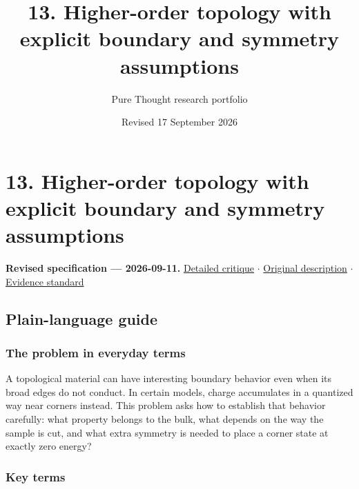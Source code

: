\documentclass[
  11pt,
]{article}
\title{13. Higher-order topology with explicit boundary and symmetry
assumptions}
\author{Pure Thought research portfolio}
\date{Revised 17 September 2026}
\begin{document}
\maketitle
\thispagestyle{empty}
\clearpage

\section{13. Higher-order topology with explicit boundary and symmetry
assumptions}

\textbf{Revised specification --- 2026-09-11.}
\href{https://github.com/rick-stevens-ai/Pure-Thought/blob/main/reviews/13-Higher-Order-Topological-Insulators.md}{Detailed
critique} \ensuremath{\cdot}
\href{https://github.com/rick-stevens-ai/Pure-Thought/blob/main/archive/original-PRDs/13-Higher-Order-Topological-Insulators.md}{Original
description} \ensuremath{\cdot}
\href{https://github.com/rick-stevens-ai/Pure-Thought/blob/main/reviews/EVIDENCE-STANDARD.md}{Evidence
standard}

\subsection{Plain-language guide}

\subsubsection{The problem in everyday terms}

A topological material can have interesting boundary behavior even when
its broad edges do not conduct. In certain models, charge accumulates in
a quantized way near corners instead. This problem asks how to establish
that behavior carefully: what property belongs to the bulk, what depends
on the way the sample is cut, and what extra symmetry is needed to place
a corner state at exactly zero energy?

\subsubsection{Key terms}
\end{document}

